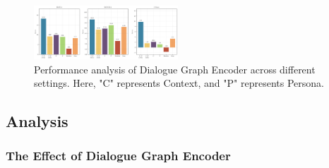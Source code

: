 \documentclass[letterpaper]{article} %
\begin{document}
\begin{figure}[ht]
    \centering
    \includegraphics[width=0.48\textwidth]{./images/effectiveness_of_dialogue_graph_encoder.png}
    \caption{Performance analysis of Dialogue Graph Encoder across different settings. Here, "C" represents Context, and "P" represents Persona.}
    \label{fig:effectiveness_of_dialogue_graph_encoder}
\end{figure}

\subsection{Analysis}
\subsubsection{The Effect of Dialogue Graph Encoder}
\end{document}
